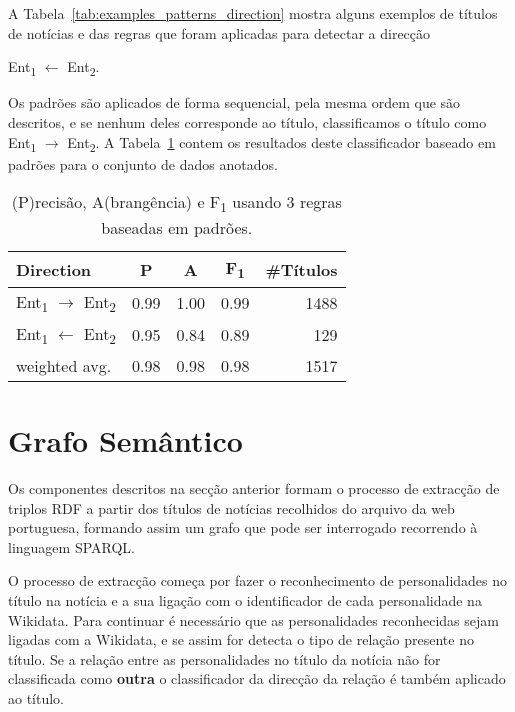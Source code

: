 \documentclass[a4paper, twocolumn, 11pt, twoside]{article}
\begin{document}
A Tabela~\ref{tab:examples_patterns_direction} mostra alguns exemplos de títulos de notícias e das regras que foram aplicadas para detectar a direcção {Ent\textsubscript{1} $\leftarrow$ Ent\textsubscript{2}.

Os padrões são aplicados de forma sequencial, pela mesma ordem que são descritos, e se nenhum deles corresponde ao título, classificamos o título como {Ent\textsubscript{1} $\rightarrow$ Ent\textsubscript{2}}. A Tabela~\ref{tab:direction_clf_results} contem os resultados deste classificador baseado em padrões para o conjunto de dados anotados.

\begin{table}
    \begin{center}
    \begin{tabular}{l cccr}
        {\bf Direction} & {\bf P} & {\bf A} & {\bf F\textsubscript{1}} & {\bf \#Títulos} \\
        \hline
        \small{Ent\textsubscript{1} $\rightarrow$ Ent\textsubscript{2}} & 0.99  &  1.00  &  0.99  & 1488 \\
		\small{Ent\textsubscript{1} $\leftarrow$ Ent\textsubscript{2}}  & 0.95  &  0.84  &  0.89  & 129  \\
		\hline
	    weighted avg.     &      0.98       & 0.98       & 0.98		&   1517 \\
    \end{tabular}
	\caption{(P)recisão, A(brangência) e F\textsubscript{1} usando 3 regras baseadas em padrões.}
	\label{tab:direction_clf_results}
	\end{center}
\end{table}

\section{Grafo Semântico}
\label{sec:pipeline}


Os componentes descritos na secção anterior formam o processo de extracção de triplos RDF a partir dos títulos de notícias recolhidos do arquivo da web portuguesa, formando assim um grafo que pode ser interrogado recorrendo à linguagem SPARQL.

O processo de extracção começa por fazer o reconhecimento de personalidades no título na notícia e a sua ligação com o identificador de cada personalidade na Wikidata. Para continuar é necessário que as personalidades reconhecidas sejam ligadas com a Wikidata, e se assim for detecta o tipo de relação presente no título.  Se a relação entre as personalidades no título da notícia não for classificada como \textbf{outra} o classificador da direcção da relação é também aplicado ao título. 

}
\end{document}
